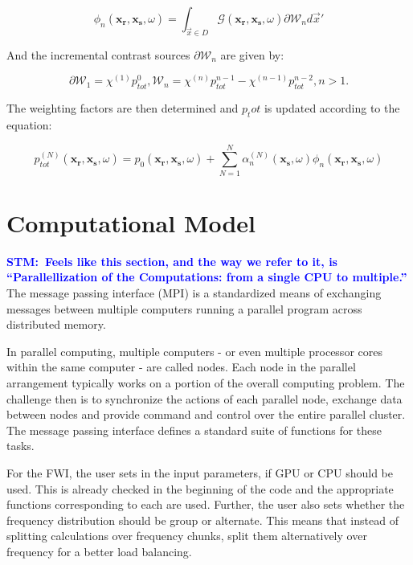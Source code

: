 \documentclass[10pt,a4paper]{article}
\newcommand{\commentstm}[1]{\textcolor{blue}{\textbf{STM:\ #1}}}
\begin{document}
\begin{equation} \label{eq:eq30} \phi_n (\mathbf{x_\text{r}},\mathbf{x_\text{s}},\omega) = \int_{\vec{x}\in D} \mathcal{G} (\mathbf{x_\text{r}},\mathbf{x_\text{s}},\omega)\partial \mathcal{W}_n d\vec{x}' \end{equation}

And the incremental contrast sources $\partial \mathcal{W}_n$ are given by:

\begin{equation} \label{eq:eq31} \partial \mathcal{W}_1 = \chi^{(1)} p^{0}_{tot} , \mathcal{W}_n = \chi^{(n)} p^{n-1}_{tot} - \chi^{(n-1)} p^{n-2}_{tot}, n > 1. \end{equation}

The weighting factors are then determined and $p_tot$ is updated according to the equation:

\begin{equation} \label{eq:eq32} p^{(N)}_{tot} (\mathbf{x_\text{r}},\mathbf{x_\text{s}},\omega) =  p_0 (\mathbf{x_\text{r}},\mathbf{x_\text{s}},\omega) + \sum\limits_{N=1}^N \alpha^{(N)}_n (\mathbf{x_\text{s}},\omega) \phi_n (\mathbf{x_\text{r}},\mathbf{x_\text{s}},\omega) \end{equation}

\section{Computational Model}
\commentstm{Feels like this section, and the way we refer to it, is ``Parallellization of the Computations: from a single CPU to multiple.''}
The message passing interface (MPI) is a standardized means of exchanging messages between multiple computers running a parallel program across distributed memory.

In parallel computing, multiple computers - or even multiple processor cores within the same computer - are called nodes.  Each node in the parallel arrangement typically works on a portion of the overall computing problem. The challenge then is to synchronize the actions of each parallel node, exchange data between nodes and provide command and control over the entire parallel cluster. The message passing interface defines a standard suite of functions for these tasks.

For the FWI, the user sets in the input parameters, if GPU or CPU should be used. This is already checked in the beginning of the code and the appropriate functions corresponding to each are used. Further, the user also sets whether the frequency distribution should be group or alternate. This means that instead of splitting calculations over frequency chunks, split them alternatively over frequency for a better load balancing.
\end{document}
